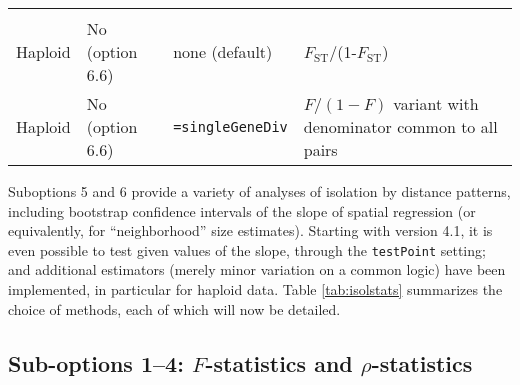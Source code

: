 \documentclass[12pt,]{book}
\theoremstyle{definition}
\theoremstyle{definition}
\theoremstyle{definition}
\theoremstyle{remark}
\begin{document}
\begin{longtable}[]{@{}llll@{}}
\begin{minipage}[t]{0.45\columnwidth}
\end{minipage}\tabularnewline
\begin{minipage}[t]{0.08\columnwidth}\raggedright\strut
Haploid\strut
\end{minipage} & \begin{minipage}[t]{0.16\columnwidth}\raggedright\strut
No (option 6.6)\strut
\end{minipage} & \begin{minipage}[t]{0.19\columnwidth}\raggedright\strut
none (default)\strut
\end{minipage} & \begin{minipage}[t]{0.45\columnwidth}\raggedright\strut
\(F_\mathrm{ST}\)/(1-\(F_\mathrm{ST}\))\strut
\end{minipage}\tabularnewline
\begin{minipage}[t]{0.08\columnwidth}\raggedright\strut
Haploid\strut
\end{minipage} & \begin{minipage}[t]{0.16\columnwidth}\raggedright\strut
No (option 6.6)\strut
\end{minipage} & \begin{minipage}[t]{0.19\columnwidth}\raggedright\strut
\texttt{=singleGeneDiv}\strut
\end{minipage} & \begin{minipage}[t]{0.45\columnwidth}\raggedright\strut
\(F/(1-F)\) variant with denominator common to all pairs\strut
\end{minipage}\tabularnewline
\bottomrule
\end{longtable}

Suboptions 5 and 6 provide a variety of analyses of isolation by
distance patterns, including bootstrap confidence intervals of the slope
of spatial regression (or equivalently, for ``neighborhood'' size
estimates). Starting with version 4.1, it is even possible to test given
values of the slope, through the \texttt{testPoint} setting; and
additional estimators (merely minor variation on a common logic) have
been implemented, in particular for haploid data. Table
\ref{tab:isolstats} summarizes the choice of methods, each of which will
now be detailed.

\subsection{\texorpdfstring{Sub-options 1--4: \(F\)-statistics and
\(\rho\)-statistics}{Sub-options 1--4: F-statistics and \textbackslash{}rho-statistics}}\label{sub-options-14-f-statistics-and-rho-statistics}
\end{document}
